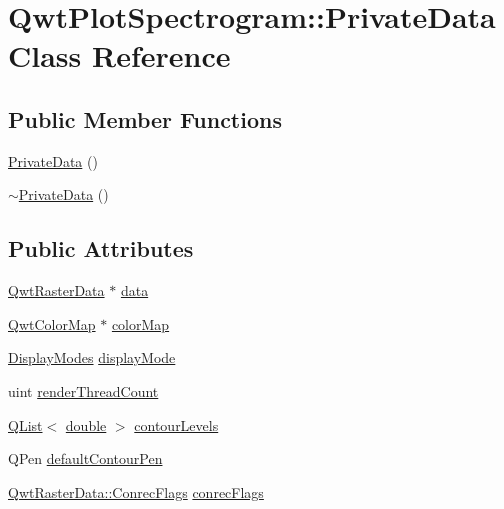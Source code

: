 \hypertarget{class_qwt_plot_spectrogram_1_1_private_data}{\section{Qwt\-Plot\-Spectrogram\-:\-:Private\-Data Class Reference}
\label{class_qwt_plot_spectrogram_1_1_private_data}
}
\subsection*{Public Member Functions}
\begin{DoxyCompactItemize}
\item 
\hyperlink{class_qwt_plot_spectrogram_1_1_private_data_a84bbb6531aef32d1d0a69cd3cecdb4b7}{Private\-Data} ()
\item 
\hyperlink{class_qwt_plot_spectrogram_1_1_private_data_a7450cb49d87b61bd9a9b889a6fff6d7c}{$\sim$\-Private\-Data} ()
\end{DoxyCompactItemize}
\subsection*{Public Attributes}
\begin{DoxyCompactItemize}
\item 
\hyperlink{class_qwt_raster_data}{Qwt\-Raster\-Data} $\ast$ \hyperlink{class_qwt_plot_spectrogram_1_1_private_data_a5dfc458e70a29037fa30466ed351581e}{data}
\item 
\hyperlink{class_qwt_color_map}{Qwt\-Color\-Map} $\ast$ \hyperlink{class_qwt_plot_spectrogram_1_1_private_data_a979aec599cf08359740b6eb30f956910}{color\-Map}
\item 
\hyperlink{class_qwt_plot_spectrogram_a245a6d1281abe84d177d61be0698db55}{Display\-Modes} \hyperlink{class_qwt_plot_spectrogram_1_1_private_data_afa7abe119f84de95e0223ab7651276f3}{display\-Mode}
\item 
uint \hyperlink{class_qwt_plot_spectrogram_1_1_private_data_a9b7cbbeef79277caceb716b59f23c7f8}{render\-Thread\-Count}
\item 
\hyperlink{class_q_list}{Q\-List}$<$ \hyperlink{_super_l_u_support_8h_a8956b2b9f49bf918deed98379d159ca7}{double} $>$ \hyperlink{class_qwt_plot_spectrogram_1_1_private_data_a823d947870c43e7e5070b5b76f64ed76}{contour\-Levels}
\item 
Q\-Pen \hyperlink{class_qwt_plot_spectrogram_1_1_private_data_aaec8757fce4a141e028d7916c6414025}{default\-Contour\-Pen}
\item 
\hyperlink{class_qwt_raster_data_a8101f4a0c71813d49fcdc73a457c4874}{Qwt\-Raster\-Data\-::\-Conrec\-Flags} \hyperlink{class_qwt_plot_spectrogram_1_1_private_data_a7c09476d3d3106c906cbc1fe7575bd32}{conrec\-Flags}
\end{DoxyCompactItemize}


